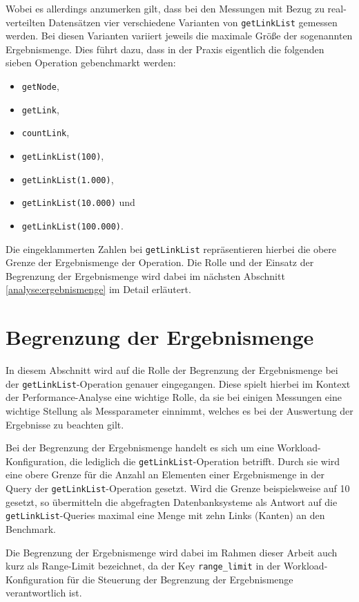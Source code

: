 Wobei es allerdings anzumerken gilt, dass bei den Messungen mit Bezug zu real-verteilten Datensätzen vier verschiedene Varianten von \texttt{getLinkList} gemessen werden. Bei diesen Varianten variiert jeweils die maximale Größe der sogenannten Ergebnismenge. Dies führt dazu, dass in der Praxis eigentlich die folgenden sieben Operation gebenchmarkt werden:
\begin{itemize}
    \item \texttt{getNode},
    \item \texttt{getLink},
    \item \texttt{countLink},
    \item \texttt{getLinkList(100)},
    \item \texttt{getLinkList(1.000)},
    \item \texttt{getLinkList(10.000)} und
    \item \texttt{getLinkList(100.000)}.
\end{itemize}
Die eingeklammerten Zahlen bei \texttt{getLinkList} repräsentieren hierbei die obere Grenze der Ergebnismenge der Operation. Die Rolle und der Einsatz der Begrenzung der Ergebnismenge wird dabei im nächsten Abschnitt \autoref{analyse:ergebnismenge} im Detail erläutert. 

\section{Begrenzung der Ergebnismenge}
\label{analyse:ergebnismenge}
In diesem Abschnitt wird auf die Rolle der Begrenzung der Ergebnismenge bei der \texttt{getLinkList}-Operation genauer eingegangen. Diese spielt hierbei im Kontext der Performance-Analyse eine wichtige Rolle, da sie bei einigen Messungen eine wichtige Stellung als Messparameter einnimmt, welches es bei der Auswertung der Ergebnisse zu beachten gilt. 

Bei der Begrenzung der Ergebnismenge handelt es sich um eine Workload-Konfiguration, die lediglich die \texttt{getLinkList}-Operation betrifft. Durch sie wird eine obere Grenze für die Anzahl an Elementen einer Ergebnismenge in der Query der \texttt{getLinkList}-Operation gesetzt. Wird die Grenze beispielsweise auf 10 gesetzt, so übermitteln die abgefragten Datenbanksysteme als Antwort auf die \texttt{getLinkList}-Queries maximal eine Menge mit zehn Links (Kanten) an den Benchmark. 

Die Begrenzung der Ergebnismenge wird dabei im Rahmen dieser Arbeit auch kurz als Range-Limit bezeichnet, da der Key \texttt{range\_limit} in der Workload-Konfiguration für die Steuerung der Begrenzung der Ergebnismenge verantwortlich ist.

